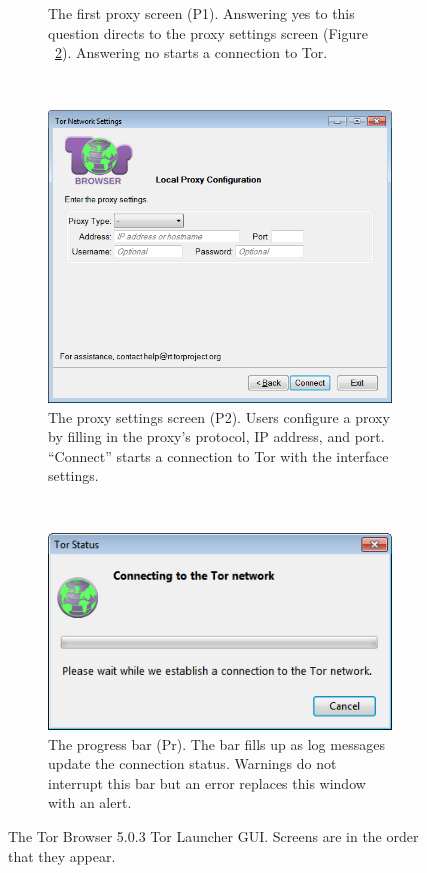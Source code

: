 \documentclass[USenglish,oneside,twocolumn]{article}
\begin{document}
\begin{figure}
\begin{subfigure}[b]{0.30\textwidth}
	\centering\captionsetup{width=1.5\linewidth}%
	\caption{The first proxy screen (P1). Answering yes to this question directs to the proxy settings screen (Figure ~\ref{fig:old-proxy-yes}). Answering no starts a connection to Tor.}
	\label{fig:old-proxy}
\end{subfigure}
~~~~~~~~~~
\begin{subfigure}[b]{0.30\textwidth}
	\includegraphics[width=\textwidth]{screenshots/OLD-proxyYES.png}
	\centering\captionsetup{width=1.5\linewidth}%
	\caption{The proxy settings screen (P2). Users configure a proxy by filling in the proxy's protocol, IP address, and port. ``Connect'' starts a connection to Tor with the interface settings.}
	\label{fig:old-proxy-yes}
\end{subfigure}
~~~~~~~~~~~~~~~~~~~~~~~~~
\begin{subfigure}[b]{0.30\textwidth}
	\includegraphics[width=\textwidth]{screenshots/OLD-progress.png}
	\centering\captionsetup{width=1.5\linewidth}%
	\caption{The progress bar (Pr). The bar fills up as log messages update the connection status. Warnings do not interrupt this bar but an error replaces this window with an alert. }
	\label{fig:old-progress}
\end{subfigure}
\caption{
The Tor Browser 5.0.3 Tor Launcher GUI. Screens are in the order that they appear. 
}
\label{fig:old-interface}
\end{figure} 
\end{document}

